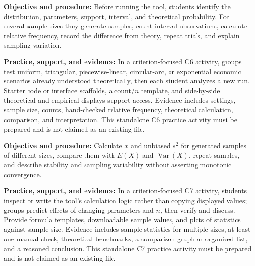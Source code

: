 \documentclass[10pt,letterpaper]{article}
\newcommand{\labelled}[2]{\textbf{#1:} #2\par}
\newcommand{\criterionpart}[1]{\Needspace{10\baselineskip}\par\vspace{4pt}{\bfseries #1\par}}
\begin{document}
	\criterionpart{C6 -- Relative frequencies and theoretical probabilities}
	\labelled{Objective and procedure}{Before running the tool, students identify the distribution, parameters, support, interval, and theoretical probability. For several sample sizes they generate samples, count interval observations, calculate relative frequency, record the difference from theory, repeat trials, and explain sampling variation.}
	\labelled{Practice, support, and evidence}{In a criterion-focused C6 activity, groups test uniform, triangular, piecewise-linear, circular-arc, or exponential economic scenarios already understood theoretically, then each student analyzes a new run. Starter code or interface scaffolds, a count/$n$ template, and side-by-side theoretical and empirical displays support access. Evidence includes settings, sample size, counts, hand-checked relative frequency, theoretical calculation, comparison, and interpretation. This standalone C6 practice activity must be prepared and is not claimed as an existing file.}
	
	\criterionpart{C7 -- Sample means and variances across sample sizes}
	\labelled{Objective and procedure}{Calculate $\bar x$ and unbiased $s^2$ for generated samples of different sizes, compare them with $E(X)$ and $\operatorname{Var}(X)$, repeat samples, and describe stability and sampling variability without asserting monotonic convergence.}
	\labelled{Practice, support, and evidence}{In a criterion-focused C7 activity, students inspect or write the tool's calculation logic rather than copying displayed values; groups predict effects of changing parameters and $n$, then verify and discuss. Provide formula templates, downloadable sample values, and plots of statistics against sample size. Evidence includes sample statistics for multiple sizes, at least one manual check, theoretical benchmarks, a comparison graph or organized list, and a reasoned conclusion. This standalone C7 practice activity must be prepared and is not claimed as an existing file.}
	
\end{document}
